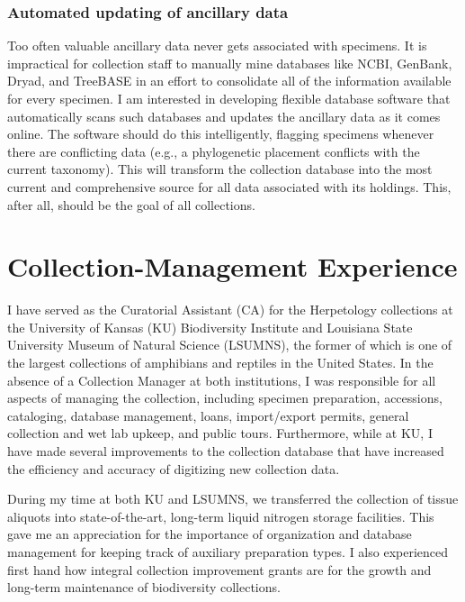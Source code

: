 \documentclass[10pt]{article}
\begin{document}
\subsubsection*{Automated updating of ancillary data}
Too often valuable ancillary data never gets associated with specimens.
It is impractical for collection staff to manually mine databases like NCBI,
GenBank, Dryad, and TreeBASE in an effort to consolidate all of the information
available for every specimen.
I am interested in developing flexible database software that automatically
scans such databases and updates the ancillary data as it comes online.
The software should do this intelligently, flagging specimens whenever there
are conflicting data (e.g., a phylogenetic placement conflicts with the current
taxonomy).
This will transform the collection database into the most current and
comprehensive source for all data associated with its holdings.
This, after all, should be the goal of all collections.


\section*{Collection-Management Experience}
I have served as the Curatorial Assistant (CA) for the Herpetology collections
at the University of Kansas (KU) Biodiversity Institute and Louisiana State
University Museum of Natural Science (LSUMNS), the former of which is one of
the largest collections of amphibians and reptiles in the United States.
In the absence of a Collection Manager at both institutions, I was responsible
for all aspects of managing the collection, including specimen preparation,
accessions, cataloging, database management, loans, import/export permits, 
general collection and wet lab upkeep, and public tours.
Furthermore, while at KU, I have made several improvements to the collection
database that have increased the efficiency and accuracy of digitizing new
collection data.

During my time at both KU and LSUMNS, we transferred the collection of tissue
aliquots into state-of-the-art, long-term liquid nitrogen storage facilities.
This gave me an appreciation for the importance of organization and database
management for keeping track of auxiliary preparation types.
I also experienced first hand how integral collection improvement grants are
for the growth and long-term maintenance of biodiversity collections.
\end{document}
